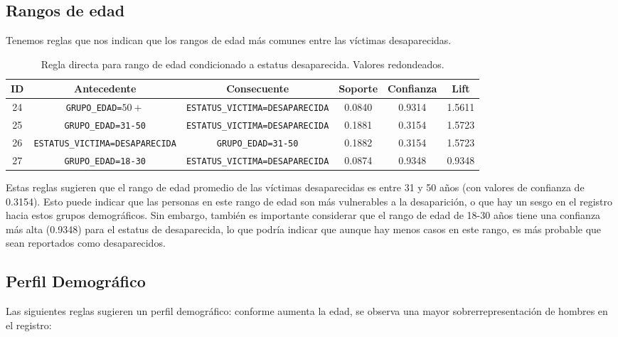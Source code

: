 \subsection{Rangos de edad}

Tenemos reglas que nos indican que los rangos de edad más comunes entre las víctimas desaparecidas.

\begin{table}[H]
\centering
\small
\begin{tabular}{cccccc}
\hline
ID & Antecedente & Consecuente & Soporte & Confianza & Lift \\
\hline
24 & \texttt{GRUPO\_EDAD=$50+$} & \texttt{ESTATUS\_VICTIMA=DESAPARECIDA} & 0.0840 & 0.9314 & 1.5611 \\
25 & \texttt{GRUPO\_EDAD=31-50} & \texttt{ESTATUS\_VICTIMA=DESAPARECIDA} & 0.1881 & 0.3154 & 1.5723 \\
26 & \texttt{ESTATUS\_VICTIMA=DESAPARECIDA} & \texttt{GRUPO\_EDAD=31-50} & 0.1882 & 0.3154 & 1.5723 \\
27 & \texttt{GRUPO\_EDAD=18-30} & \texttt{ESTATUS\_VICTIMA=DESAPARECIDA} & 0.0874 & 0.9348 & 0.9348 \\
\hline
\end{tabular}
\caption{Regla directa para rango de edad condicionado a estatus desaparecida. Valores redondeados.}
\label{tab:edad_dado_desaparecida}
\end{table}

Estas reglas sugieren que el rango de edad promedio de las víctimas desaparecidas es entre 31 y 50 años (con valores de
confianza de 0.3154). Esto puede indicar que las personas en este rango de edad son más vulnerables a la desaparición, o
que hay un sesgo en el registro hacia estos grupos demográficos. Sin embargo, también es importante considerar que el rango
de edad de 18-30 años tiene una confianza más alta (0.9348) para el estatus de desaparecida, lo que podría indicar que aunque
hay menos casos en este rango, es más probable que sean reportados como desaparecidos.

\subsection{Perfil Demográfico}

Las siguientes reglas sugieren un perfil demográfico: conforme aumenta la edad, se observa una mayor sobrerrepresentación de hombres en el registro:

